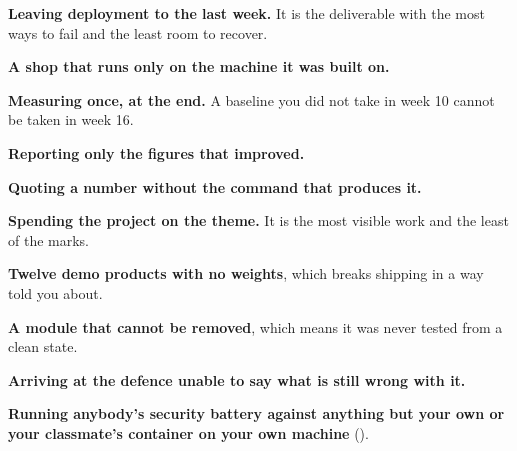 \begin{pitfall}
\begin{tight}
  \item \textbf{Leaving deployment to the last week.} It is the deliverable
        with the most ways to fail and the least room to recover.
  \item \textbf{A shop that runs only on the machine it was built on.}
  \item \textbf{Measuring once, at the end.} A baseline you did not take in
        week 10 cannot be taken in week 16.
  \item \textbf{Reporting only the figures that improved.}
  \item \textbf{Quoting a number without the command that produces it.}
  \item \textbf{Spending the project on the theme.} It is the most visible work
        and the least of the marks.
  \item \textbf{Twelve demo products with no weights}, which breaks shipping
        in a way  told you about.
  \item \textbf{A module that cannot be removed}, which means it was never
        tested from a clean state.
  \item \textbf{Arriving at the defence unable to say what is still wrong with
        it.}
  \item \textbf{Running anybody's security battery against anything but your
        own or your classmate's container on your own machine}
        ().
\end{tight}
\end{pitfall}

